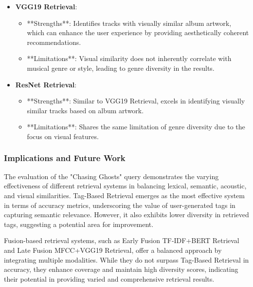 \documentclass[sigconf]{acmart}
\begin{document}
\begin{itemize}
    \item \textbf{VGG19 Retrieval}:
    \begin{itemize}
        \item **Strengths**: Identifies tracks with visually similar album artwork, which can enhance the user experience by providing aesthetically coherent recommendations.
        \item **Limitations**: Visual similarity does not inherently correlate with musical genre or style, leading to genre diversity in the results.
    \end{itemize}
    
    \item \textbf{ResNet Retrieval}:
    \begin{itemize}
        \item **Strengths**: Similar to VGG19 Retrieval, excels in identifying visually similar tracks based on album artwork.
        \item **Limitations**: Shares the same limitation of genre diversity due to the focus on visual features.
    \end{itemize}
\end{itemize}

\subsubsection{Implications and Future Work}

The evaluation of the "Chasing Ghosts" query demonstrates the varying effectiveness of different retrieval systems in balancing lexical, semantic, acoustic, and visual similarities. Tag-Based Retrieval emerges as the most effective system in terms of accuracy metrics, underscoring the value of user-generated tags in capturing semantic relevance. However, it also exhibits lower diversity in retrieved tags, suggesting a potential area for improvement.

Fusion-based retrieval systems, such as Early Fusion TF-IDF+BERT Retrieval and Late Fusion MFCC+VGG19 Retrieval, offer a balanced approach by integrating multiple modalities. While they do not surpass Tag-Based Retrieval in accuracy, they enhance coverage and maintain high diversity scores, indicating their potential in providing varied and comprehensive retrieval results.
\end{document}
